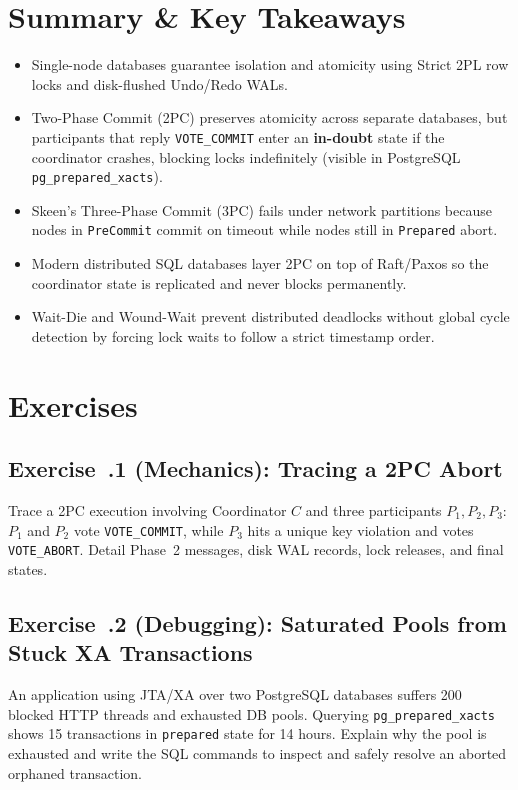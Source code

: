 \section{Summary \protect\& Key Takeaways}
\begin{itemize}[leftmargin=18pt]
  \item Single-node databases guarantee isolation and atomicity using Strict 2PL row locks and disk-flushed Undo/Redo WALs.
  \item Two-Phase Commit (2PC) preserves atomicity across separate databases, but participants that reply \texttt{VOTE\_COMMIT} enter an \textbf{in-doubt} state if the coordinator crashes, blocking locks indefinitely (visible in PostgreSQL \texttt{pg\_prepared\_xacts}).
  \item Skeen's Three-Phase Commit (3PC) fails under network partitions because nodes in \texttt{PreCommit} commit on timeout while nodes still in \texttt{Prepared} abort.
  \item Modern distributed SQL databases layer 2PC on top of Raft/Paxos so the coordinator state is replicated and never blocks permanently.
  \item Wait-Die and Wound-Wait prevent distributed deadlocks without global cycle detection by forcing lock waits to follow a strict timestamp order.
\end{itemize}

\section{Exercises}

\subsection*{Exercise~\thechapter.1 (Mechanics): Tracing a 2PC Abort}
Trace a 2PC execution involving Coordinator $C$ and three participants $P_1, P_2, P_3$: $P_1$ and $P_2$ vote \texttt{VOTE\_COMMIT}, while $P_3$ hits a unique key violation and votes \texttt{VOTE\_ABORT}. Detail Phase~2 messages, disk WAL records, lock releases, and final states.

\subsection*{Exercise~\thechapter.2 (Debugging): Saturated Pools from Stuck XA Transactions}
An application using JTA/XA over two PostgreSQL databases suffers 200 blocked HTTP threads and exhausted DB pools. Querying \texttt{pg\_prepared\_xacts} shows 15 transactions in \texttt{prepared} state for 14 hours. Explain why the pool is exhausted and write the SQL commands to inspect and safely resolve an aborted orphaned transaction.

